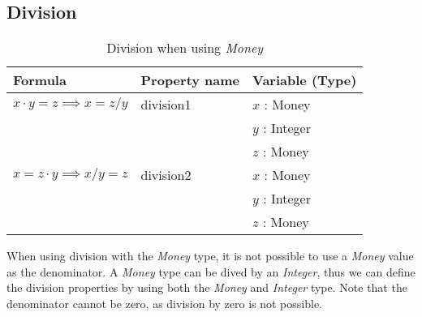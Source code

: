 \subsection*{Division}
\label{ssct:properties_division}
\begin{table}[!ht]
\centering
\begin{tabular}{lll}
\hline
                        \textbf{Formula}                   & \textbf{Property name} & \textbf{Variable (Type)} \\ \hline
\rowcolor[HTML]{EFEFEF} $x \cdot y = z \implies x = z / y$ & division1              & $x$ : Money              \\
\rowcolor[HTML]{EFEFEF}                                    &                        & $y$ : Integer            \\
\rowcolor[HTML]{EFEFEF}                                    &                        & $z$ : Money              \\
                        $x = z \cdot y \implies x / y = z$ & division2              & $x$ : Money              \\
                                                           &                        & $y$ : Integer            \\
                                                           &                        & $z$ : Money              \\ \hline
\end{tabular}
\caption{Division when using \textit{Money}}
\label{tbl:ch4_money_division}
\end{table}
\FloatBarrier\noindent
When using division with the \textit{Money} type, it is not possible to use a
\textit{Money} value as the denominator. A \textit{Money} type can be dived by
an \textit{Integer}, thus we can define the division properties by using both
the \textit{Money} and \textit{Integer} type. Note that the denominator cannot
be zero, as division by zero is not possible. %

